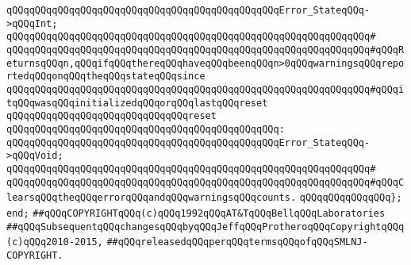 \verb|qQQqqQQqqQQqqQQqqQQqqQQqqQQqqQQqqQQqqQQqqQQqqQQqError_StateqQQq->qQQqInt;|\newline
\verb|qQQqqQQqqQQqqQQqqQQqqQQqqQQqqQQqqQQqqQQqqQQqqQQqqQQqqQQqqQQqqQQq#|\newline
\verb|qQQqqQQqqQQqqQQqqQQqqQQqqQQqqQQqqQQqqQQqqQQqqQQqqQQqqQQqqQQqqQQq#qQQqReturnsqQQqn,qQQqifqQQqthereqQQqhaveqQQqbeenqQQqn>0qQQqwarningsqQQqreportedqQQqonqQQqtheqQQqstateqQQqsince|\newline
\verb|qQQqqQQqqQQqqQQqqQQqqQQqqQQqqQQqqQQqqQQqqQQqqQQqqQQqqQQqqQQqqQQq#qQQqitqQQqwasqQQqinitializedqQQqorqQQqlastqQQqreset|\newline
\newline
\verb|qQQqqQQqqQQqqQQqqQQqqQQqqQQqqQQqreset|\newline
\verb|qQQqqQQqqQQqqQQqqQQqqQQqqQQqqQQqqQQqqQQqqQQqqQQq:|\newline
\verb|qQQqqQQqqQQqqQQqqQQqqQQqqQQqqQQqqQQqqQQqqQQqqQQqError_StateqQQq->qQQqVoid;|\newline
\verb|qQQqqQQqqQQqqQQqqQQqqQQqqQQqqQQqqQQqqQQqqQQqqQQqqQQqqQQqqQQqqQQq#|\newline
\verb|qQQqqQQqqQQqqQQqqQQqqQQqqQQqqQQqqQQqqQQqqQQqqQQqqQQqqQQqqQQqqQQq#qQQqClearsqQQqtheqQQqerrorqQQqandqQQqwarningsqQQqcounts.|\newline
\newline
\verb|qQQqqQQqqQQqqQQq};|\newline
\verb|end;|\newline
\newline
\verb|##qQQqCOPYRIGHTqQQq(c)qQQq1992qQQqAT&TqQQqBellqQQqLaboratories|\newline
\verb|##qQQqSubsequentqQQqchangesqQQqbyqQQqJeffqQQqProtheroqQQqCopyrightqQQq(c)qQQq2010-2015,|\newline
\verb|##qQQqreleasedqQQqperqQQqtermsqQQqofqQQqSMLNJ-COPYRIGHT.|\newline

